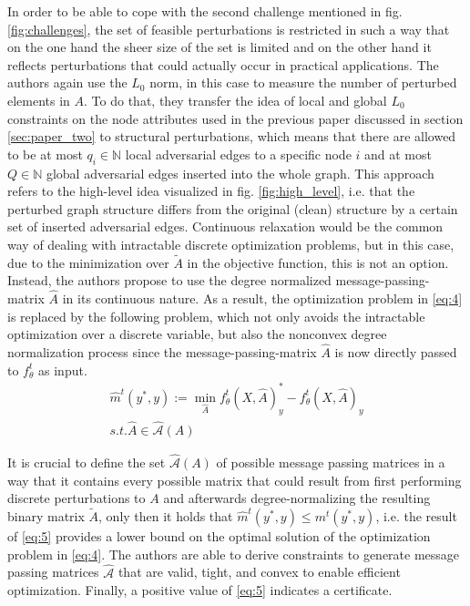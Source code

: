 \documentclass[a4paper,preprint]{sig-alternate}
\begin{document}
In order to be able to cope with the second challenge mentioned in fig. \ref{fig:challenges}, the set of feasible perturbations
is restricted in such a way that on the one hand the sheer size of the set is limited and on the other hand
it reflects perturbations that could actually occur in practical applications. \cite{10.1145/3394486.3403217}
The authors again use the $L_0$ norm, in this case to measure the number of perturbed elements in $A$.
To do that, they transfer the idea of local and global $L_0$ constraints on the node attributes used in the previous paper 
discussed in section \ref{sec:paper_two} to structural perturbations, which means that there are allowed to be at most
$q_i \in \mathbb{N}$ local adversarial edges to a specific node $i$ and at most $Q \in \mathbb{N}$ global adversarial
edges inserted into the whole graph. \cite{10.1145/3394486.3403217}
This approach refers to the high-level idea visualized in fig. \ref{fig:high_level}, i.e. that the perturbed graph structure
differs from the original (clean) structure by a certain set of inserted adversarial edges.\newline
Continuous relaxation would be the common way of dealing with intractable discrete optimization problems,
but in this case, due to the minimization over $\tilde{A}$ in the objective function, this is not an option. \cite{10.1145/3394486.3403217}
Instead, the authors propose to use the degree normalized message-passing-matrix $\hat{A}$ in its continuous nature.
As a result, the optimization problem in \ref{eq:4} is replaced by the following problem, which not only avoids 
the intractable optimization over a discrete variable, but also the nonconvex degree normalization process
since the message-passing-matrix $\hat{A}$ is now directly passed to $f_{\theta}^t$ as input. \cite{10.1145/3394486.3403217}
\begin{gather}
\label{eq:5}
    \hat{m}^t (y^{\ast}, y) := \min_{\hat{A}} f_{\theta}^t (X, \hat{A})_y^{\ast}
    - f_{\theta}^t (X, \hat{A})_y \\
    s.t. \hat{A} \in \mathcal{\hat{A}}(A) \nonumber
\end{gather}

\vfill
\pagebreak

It is crucial to define the set $\mathcal{\hat{A}}(A)$ of possible message passing matrices in a way that it contains
every possible matrix that could result from first performing discrete perturbations to $A$ and afterwards 
degree-normalizing the resulting binary matrix $\tilde{A}$, only then it holds that $\hat{m}^t (y^{\ast}, y) \leq m^t (y^{\ast}, y)$, 
i.e. the result of \ref{eq:5} provides a lower bound on the optimal solution of the optimization problem in \ref{eq:4}. \cite{10.1145/3394486.3403217}
The authors are able to derive constraints to generate message passing matrices $\mathcal{\hat{A}}$
that are valid, tight, and convex to enable efficient optimization.
Finally, a positive value of \ref{eq:5} indicates a certificate. \cite{10.1145/3394486.3403217} \newline
\end{document}
